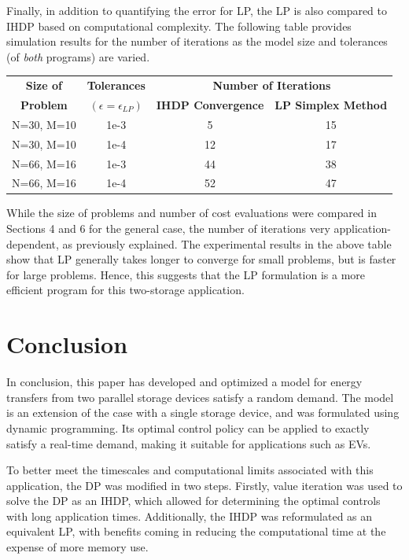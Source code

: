 \documentclass[conference]{IEEEtran}
\begin{document}
Finally, in addition to quantifying the error for LP, the LP is also compared to IHDP based on computational complexity. The following table provides simulation results for the number of iterations as the model size and tolerances (of \textit{both} programs) are varied.

\begin{table}[htbp]
	\begin{center}
		\begin{tabular}{|c|c|c|c|}
			\hline
			\textbf{Size of}&\textbf{Tolerances}&\multicolumn{2}{|c|}{\textbf{Number of Iterations}} \\
			\cline{3-4} 
			\textbf{Problem} & \textbf{$(\epsilon=\epsilon_{LP})$} & \textbf{IHDP Convergence} &  \textbf{LP Simplex Method} \\
			\hline
			N=30, M=10& 1e-3 & 5 & 15 \\
			\hline
			N=30, M=10& 1e-4 & 12 & 17 \\
			\hline
			N=66, M=16& 1e-3 & 44 & 38 \\
			\hline
			N=66, M=16& 1e-4 & 52 & 47 \\
			\hline
		\end{tabular}
		\label{tab1}
	\end{center}
\end{table}While the size of problems and number of cost evaluations were compared in Sections 4 and 6 for the general case, the number of iterations very application-dependent, as previously explained. The experimental results in the above table show that LP generally takes longer to converge for small problems, but is faster for large problems. Hence, this suggests that the LP formulation is a more efficient program for this two-storage application.

\section{Conclusion}
In conclusion, this paper has developed and optimized a model for energy transfers from two parallel storage devices satisfy a random demand. The model is an extension of the case with a single storage device, and was formulated using dynamic programming. Its optimal control policy can be applied to exactly satisfy a real-time demand, making it suitable for applications such as EVs.

To better meet the timescales and computational limits associated with this application, the DP was modified in two steps. Firstly, value iteration was used to solve the DP as an IHDP, which allowed for determining the optimal controls with long application times. Additionally, the IHDP was reformulated as an equivalent LP, with benefits coming in reducing the computational time at the expense of more memory use.
\end{document}
